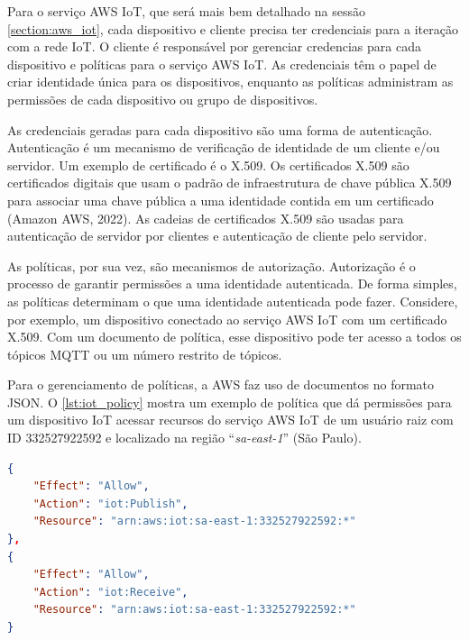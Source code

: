 Para o serviço AWS IoT, que será mais bem detalhado na sessão \autoref{section:aws_iot}, cada dispositivo e cliente precisa ter credenciais para a iteração com a rede IoT. O cliente é responsável por gerenciar credencias para cada dispositivo e políticas para o serviço AWS IoT. As credenciais têm o papel de criar identidade única para os dispositivos, enquanto as políticas administram as permissões de cada dispositivo ou grupo de dispositivos.

As credenciais geradas para cada dispositivo são uma forma de autenticação. Autenticação é um mecanismo de verificação de identidade de um cliente e/ou servidor. Um exemplo de certificado é o X.509. Os certificados X.509 são certificados digitais que usam o padrão de infraestrutura de chave pública X.509 para associar uma chave pública a uma identidade contida em um certificado (Amazon AWS, 2022). As cadeias de certificados X.509 são usadas para autenticação de servidor por clientes e autenticação de cliente pelo servidor.

As políticas, por sua vez, são mecanismos de autorização. Autorização é o processo de garantir permissões a uma identidade autenticada. De forma simples, as políticas determinam o que uma identidade autenticada pode fazer. Considere, por exemplo, um dispositivo conectado ao serviço AWS IoT com um certificado X.509. Com um documento de política, esse dispositivo pode ter acesso a todos os tópicos MQTT ou um número restrito de tópicos.

Para o gerenciamento de políticas, a AWS faz uso de documentos no formato JSON. O \autoref{lst:iot_policy} mostra um exemplo de política que dá permissões para um dispositivo IoT acessar recursos do serviço AWS IoT de um usuário raiz com ID 332527922592 e localizado na região ``\textit{sa-east-1}'' (São Paulo).

\begin{lstlisting}[float=htbp,language=json,firstnumber=1,caption={Exemplo de uma política dando permissões de uso do serviço AWS IoT para um dispositivo IoT.},label=lst:iot_policy]
{
    "Effect": "Allow",
    "Action": "iot:Publish",
    "Resource": "arn:aws:iot:sa-east-1:332527922592:*"
},
{
    "Effect": "Allow",
    "Action": "iot:Receive",
    "Resource": "arn:aws:iot:sa-east-1:332527922592:*"
}
\end{lstlisting}

